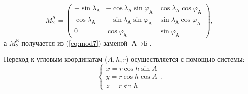 \documentclass[12pt,a4paper]{article}
\begin{document}
\begin{equation}\label{eq:mod7}
M_2^\text{А}=\begin{pmatrix} -\sin{\lambda_\text{А}} & 
-\cos{\lambda_\text{А}}\sin{\varphi_\text{А}} &
\cos{\lambda_\text{А}}\cos{\varphi_\text{А}} \\
\cos{\lambda_\text{А}} &
-\sin{\lambda_\text{А}}\sin{\varphi_\text{А}} &
\sin{\lambda_\text{А}}\cos{\varphi_\text{А}} \\
0 & \cos{\varphi_\text{А}} & \sin{\varphi_\text{А}} \end{pmatrix},
\end{equation}
а $M_2^\text{Б}$ получается из (\ref{eq:mod7}) заменой $\text{А} \rightarrow \text{Б}$.

Переход к угловым координатам ($A,h,r$) осуществляется с помощью системы:
\begin{equation}\label{eq:mod8}
\begin{cases}
x = r\cos{h}\sin{A} \\
y = r\cos{h}\cos{A} \\
z = r\sin{h}
\end{cases}.
\end{equation}


\end{document}
